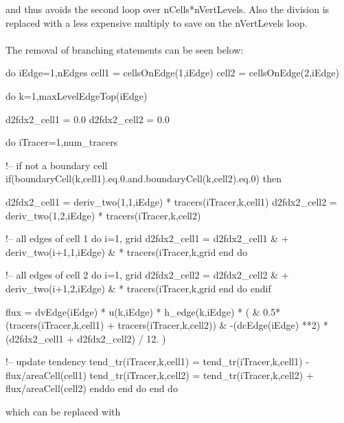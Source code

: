 \documentclass[11pt]{report}
\begin{document}
and thus avoids the second loop over nCells*nVertLevels. Also the division is replaced with a less expensive multiply to save on the nVertLevels loop. \\
\\
The removal of branching statements can be seen below:

\begin{verbatimtab}
do iEdge=1,nEdges
  cell1 = cellsOnEdge(1,iEdge)
  cell2 = cellsOnEdge(2,iEdge)

  do k=1,maxLevelEdgeTop(iEdge)

    d2fdx2_cell1 = 0.0
    d2fdx2_cell2 = 0.0

    do iTracer=1,num_tracers

      !-- if not a boundary cell
      if(boundaryCell(k,cell1).eq.0.and.boundaryCell(k,cell2).eq.0) then

        d2fdx2_cell1 = deriv_two(1,1,iEdge) * tracers(iTracer,k,cell1)
        d2fdx2_cell2 = deriv_two(1,2,iEdge) * tracers(iTracer,k,cell2)

        !-- all edges of cell 1
        do i=1, grid %
          d2fdx2_cell1 = d2fdx2_cell1 &
		      + deriv_two(i+1,1,iEdge) &
		      * tracers(iTracer,k,grid %
        end do

        !-- all edges of cell 2
        do i=1, grid %
          d2fdx2_cell2 = d2fdx2_cell2 & 
		      + deriv_two(i+1,2,iEdge) &
		      * tracers(iTracer,k,grid %
        end do
      endif

      flux = dvEdge(iEdge) *  u(k,iEdge) * h_edge(k,iEdge) * (          &
         0.5*(tracers(iTracer,k,cell1) + tracers(iTracer,k,cell2))      &
         -(dcEdge(iEdge) **2) * (d2fdx2_cell1 + d2fdx2_cell2) / 12. )

      !-- update tendency
      tend_tr(iTracer,k,cell1) = tend_tr(iTracer,k,cell1) - flux/areaCell(cell1)
      tend_tr(iTracer,k,cell2) = tend_tr(iTracer,k,cell2) + flux/areaCell(cell2)
    enddo
  end do
end do
\end{verbatimtab}

which can be replaced with
\end{document}

